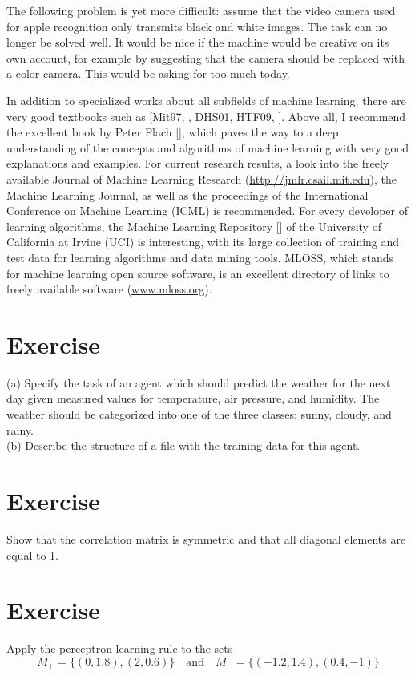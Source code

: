 \documentclass[10pt]{book}
\begin{document}
The following problem is yet more difficult: assume that the video camera used for apple recognition only transmits black and white images. The task can no longer be solved well. It would be nice if the machine would be creative on its own account, for example by suggesting that the camera should be replaced with a color camera. This would be asking for too much today.

In addition to specialized works about all subfields of machine learning, there are very good textbooks such as [Mit97, \cite{bishop2006prml}, DHS01, HTF09, \cite{alpaydin2004introduction}]. Above all, I recommend the excellent book by Peter Flach [\cite{flach2012ml}], which paves the way to a deep understanding of the concepts and algorithms of machine learning with very good explanations and examples. For current research results, a look into the freely available Journal of Machine Learning Research (\href{http://jmlr.csail.mit.edu}{http://jmlr.csail.mit.edu}), the Machine Learning Journal, as well as the proceedings of the International Conference on Machine Learning (ICML) is recommended. For every developer of learning algorithms, the Machine Learning Repository [\cite{blake1998uci}] of the University of California at Irvine (UCI) is interesting, with its large collection of training and test data for learning algorithms and data mining tools. MLOSS, which stands for machine learning open source software, is an excellent directory of links to freely available software (\href{http://www.mloss.org}{www.mloss.org}).

\section{Exercise}
(a) Specify the task of an agent which should predict the weather for the next day given measured values for temperature, air pressure, and humidity. The weather should be categorized into one of the three classes: sunny, cloudy, and rainy.\\
(b) Describe the structure of a file with the training data for this agent.

\section{Exercise}
Show that the correlation matrix is symmetric and that all diagonal elements are equal to 1.

\section{Exercise}
Apply the perceptron learning rule to the sets
$$
M_{+}=\{(0,1.8),(2,0.6)\} \quad \text{and} \quad M_{-}=\{(-1.2,1.4),(0.4,-1)\}
$$
\end{document}
